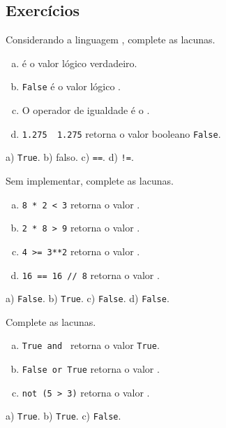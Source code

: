 \subsection{Exercícios}

\begin{exer}
  Considerando a linguagem {\python}, complete as lacunas.
  \begin{enumerate}[a)]
    \item \underline{} é o valor lógico verdadeiro.
    \item \texttt{False} é o valor lógico \underline{\phantom{falso}}.
    \item O operador de igualdade é o \underline{\phantom{\texttt{==}}}.
    \item \texttt{1.275 }\underline{\phantom{\texttt{!=}}}\texttt{ 1.275} retorna o valor booleano \texttt{False}.
  \end{enumerate}
\end{exer}
\begin{resp}
  a) \texttt{True}. b) falso. c) \texttt{==}. d) \texttt{!=}.
\end{resp}

\begin{exer}
  Sem implementar, complete as lacunas.
  \begin{enumerate}[a)]
    \item \texttt{8 * 2 < 3} retorna o valor \underline{}.
    \item \texttt{2 * 8 > 9} retorna o valor \underline{}.
    \item \texttt{4 >= 3**2} retorna o valor \underline{}.
    \item \texttt{16 == 16 // 8} retorna o valor \underline{}.
  \end{enumerate}
\end{exer}
\begin{resp}
  a) \texttt{False}.  b) \texttt{True}.  c) \texttt{False}. d) \texttt{False}.
\end{resp}

\begin{exer}
  Complete as lacunas.
  \begin{enumerate}[a)]
    \item \texttt{True and }\underline{} retorna o valor \texttt{True}.
    \item \texttt{False or True} retorna o valor \underline{}.
    \item \texttt{not (5 > 3)} retorna o valor \underline{}.
  \end{enumerate}
\end{exer}
\begin{resp}
  a) \texttt{True}. b) \texttt{True}. c) \texttt{False}.
\end{resp}


